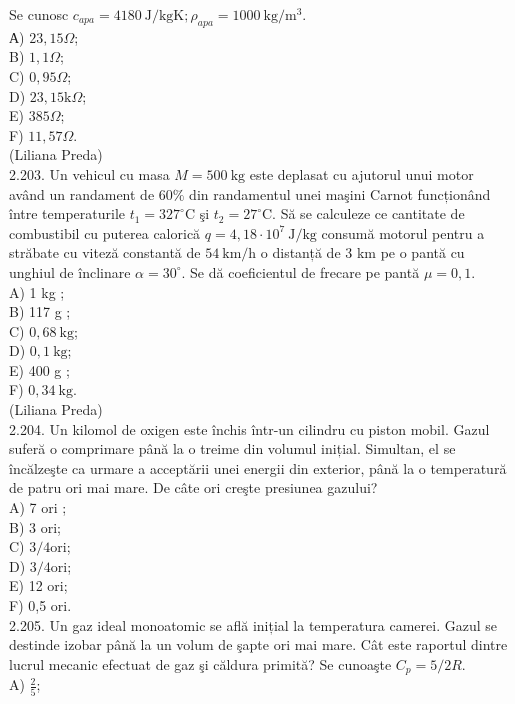 \documentclass[10pt]{article}
\begin{document}
Se cunosc $c_{a p a}=4180 \mathrm{~J} / \mathrm{kgK} ; \rho_{a p a}=1000 \mathrm{~kg} / \mathrm{m}^{3}$.\\
А) $23,15 \Omega$;\\
B) $1,1 \Omega$;\\
C) $0,95 \Omega$;\\
D) $23,15 \mathrm{k} \Omega$;\\
E) $385 \Omega$;\\
F) $11,57 \Omega$.\\
(Liliana Preda)\\
2.203. Un vehicul cu masa $M=500 \mathrm{~kg}$ este deplasat cu ajutorul unui motor având un randament de $60 \%$ din randamentul unei maşini Carnot funcționând între temperaturile $t_{1}=327^{\circ} \mathrm{C}$ şi $t_{2}=27^{\circ} \mathrm{C}$. Să se calculeze ce cantitate de combustibil cu puterea calorică $q=4,18 \cdot 10^{7} \mathrm{~J} / \mathrm{kg}$ consumă motorul pentru a străbate cu viteză constantă de $54 \mathrm{~km} / \mathrm{h}$ o distanță de 3 km pe o pantă cu unghiul de înclinare $\alpha=30^{\circ}$. Se dă coeficientul de frecare pe pantă $\mu=0,1$.\\
A) 1 kg ;\\
B) 117 g ;\\
C) $0,68 \mathrm{~kg}$;\\
D) $0,1 \mathrm{~kg}$;\\
E) 400 g ;\\
F) $0,34 \mathrm{~kg}$.\\
(Liliana Preda)\\
2.204. Un kilomol de oxigen este închis într-un cilindru cu piston mobil. Gazul suferă o comprimare până la o treime din volumul inițial. Simultan, el se încălzeşte ca urmare a acceptării unei energii din exterior, până la o temperatură de patru ori mai mare. De câte ori creşte presiunea gazului?\\
A) 7 ori ;\\
B) 3 ori;\\
C) $3 / 4 \mathrm{ori}$;\\
D) $3 / 4 \mathrm{ori}$;\\
E) 12 ori;\\
F) 0,5 ori.\\
2.205. Un gaz ideal monoatomic se află inițial la temperatura camerei. Gazul se destinde izobar până la un volum de şapte ori mai mare. Cât este raportul dintre lucrul mecanic efectuat de gaz şi căldura primită? Se cunoaşte $C_{p}=5 / 2 R$.\\
A) $\frac{2}{5}$;\\
\end{document}
